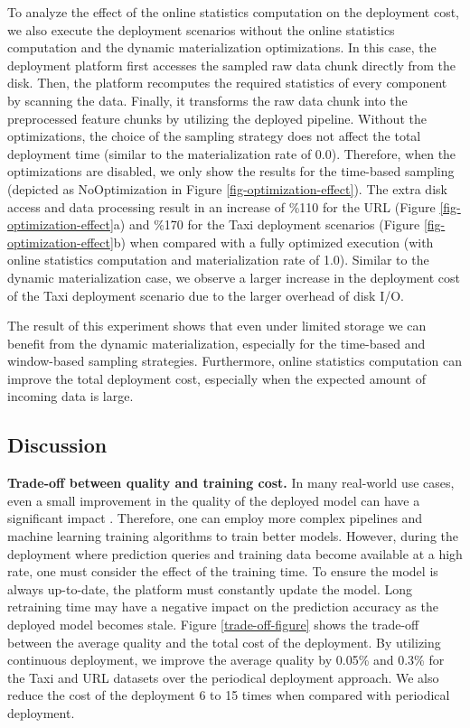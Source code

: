 To analyze the effect of the online statistics computation on the deployment cost, we also execute the deployment scenarios without the online statistics computation and the dynamic materialization optimizations.
In this case, the deployment platform first accesses the sampled raw data chunk directly from the disk.
Then, the platform recomputes the required statistics of every component by scanning the data.
Finally, it transforms the raw data chunk into the preprocessed feature chunks by utilizing the deployed pipeline.
Without the optimizations, the choice of the sampling strategy does not affect the total deployment time (similar to the materialization rate of 0.0).
Therefore, when the optimizations are disabled, we only show the results for the time-based sampling (depicted as NoOptimization in Figure \ref{fig-optimization-effect}).
The extra disk access and data processing result in an increase of \%110 for the URL (Figure \ref{fig-optimization-effect}a) and \%170 for the Taxi deployment scenarios (Figure \ref{fig-optimization-effect}b) when compared with a fully optimized execution (with online statistics computation and materialization rate of 1.0).
Similar to the dynamic materialization case, we observe a larger increase in the deployment cost of the Taxi deployment scenario due to the larger overhead of disk I/O.

The result of this experiment shows that even under limited storage we can benefit from the dynamic materialization, especially for the time-based and window-based sampling strategies.
Furthermore, online statistics computation can improve the total deployment cost, especially when the expected amount of incoming data is large.

\subsection{Discussion} \label{subsec:discussion}
\textbf{Trade-off between quality and training cost.}
In many real-world use cases, even a small improvement in the quality of the deployed model can have a significant impact  \cite{ling2017model}.
Therefore, one can employ more complex pipelines and machine learning training algorithms to train better models.
However, during the deployment where prediction queries and training data become available at a high rate, one must consider the effect of the training time.
To ensure the model is always up-to-date, the platform must constantly update the model.
Long retraining time may have a negative impact on the prediction accuracy as the deployed model becomes stale.
Figure \ref{trade-off-figure} shows the trade-off between the average quality and the total cost of the deployment.
By utilizing continuous deployment, we improve the average quality by 0.05\% and 0.3\% for the Taxi and URL datasets over the periodical deployment approach.
We also reduce the cost of the deployment 6 to 15 times when compared with periodical deployment.

